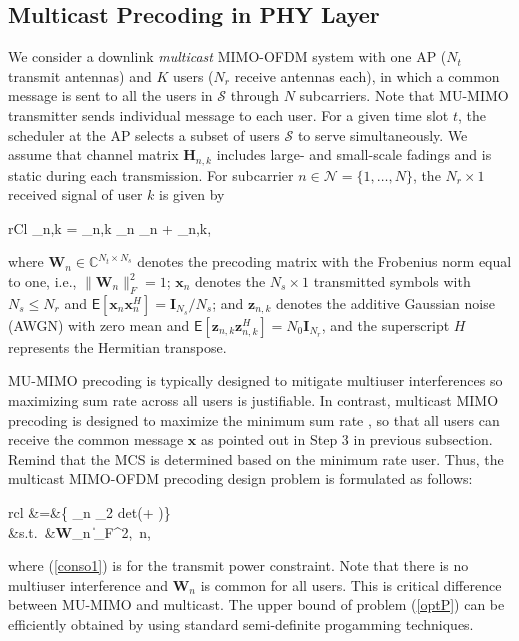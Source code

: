\documentclass[conference]{IEEEtran}
\newcommand{\vect}[1]{{\mathbf{#1}}}
\newcommand{\mat}[1]{{\mathbf{#1}}}
\newcommand{\beqna}{\begin{IEEEeqnarray}{rCl}}
\newcommand{\eeqna}{\end{IEEEeqnarray}}
\renewcommand{\r}{\vect{r}}
\newcommand{\x}{\vect{x}}
\newcommand{\z}{\vect{z}}
\newcommand{\0}{\vect{0}}
\newcommand{\1}{\vect{1}}
\renewcommand{\H}{\mat{H}}
\newcommand{\I}{\mat{I}}
\newcommand{\W}{\mat{W}}
\def \beqi{\begin{IEEEeqnarray}{rcl}\IEEEyesnumber}
\def \eeqi{\end{IEEEeqnarray}}
\def \inum{\IEEEyessubnumber}
\begin{document}
\subsection{Multicast Precoding in PHY Layer}

We consider a downlink {\it multicast} MIMO-OFDM system with one AP ($N_t$ transmit antennas) and $K$ users ($N_r$ receive antennas each), in which a common message is sent to all the users in $\mathcal{S}$ through $N$ subcarriers. Note that MU-MIMO transmitter sends individual message to each user. For a given time slot $t$, the scheduler at the AP selects a subset of users $\mathcal{S}$ to serve simultaneously. We assume that channel matrix $\H_{n,k}$ includes large- and small-scale fadings and is static during each transmission. For subcarrier $n\in\mathcal{N}=\{1,\ldots,N\}$, the $N_r \times 1$ received signal of user $k$ is given by
\beqna\nonumber
\r_{n,k} = \H_{n,k} \W_n \x_n + \z_{n,k},
\eeqna
where $\W_n\in\mathbb{C}^{N_t \times N_s}$ denotes the precoding matrix with the Frobenius norm equal to one, i.e., $\|\W_n\|_F^2=1$; $\x_n$ denotes the $N_{s} \times 1$ transmitted symbols with $N_{s}\leq N_r$ and $\mathsf{E}[\x_n\x_n^H] = \I_{N_{s}}/N_{s}$; and $\z_{n,k}$ denotes the additive Gaussian noise (AWGN) with zero mean and $\mathsf{E}[\z_{n,k}\z_{n,k}^H] = N_0 \I_{N_r}$, and the superscript $H$ represents the Hermitian transpose.



MU-MIMO precoding is typically designed to mitigate multiuser interferences so maximizing sum rate across all users is justifiable. In contrast, multicast MIMO precoding is designed to maximize the minimum sum rate \cite{JiLu06}, so that all users can receive the common message $\x$ as pointed out in Step 3 in previous subsection. Remind that the MCS is determined based on the minimum rate user. Thus, the multicast MIMO-OFDM precoding design problem is formulated as follows:
\beqi\label{optP}
\underset{\{\W_n\}}{\rm max.}\;  &=&\!\left \{
{\sum_{n\in{}}} \!\log_2 {\rm det}\!\left(\!+\!   \right)\!\!\right\}~~~~\inum\label{objo}\\
&{\rm s.t.}~&\|{\bf W}_n \|_F^2,~\forall n\in{},\inum\label{conso1}\eeqi
where (\ref{conso1}) is for the transmit power constraint. Note that there is no multiuser interference and $\W_n$ is common for all users. This is critical difference between MU-MIMO and multicast. The upper bound of problem (\ref{optP}) can be efficiently obtained by using standard semi-definite progamming techniques.
\end{document}
